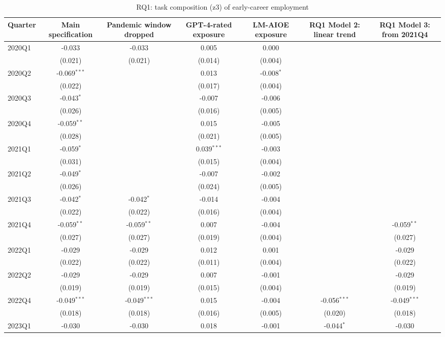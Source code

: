 \begin{table}[htbp]\centering
\caption{RQ1: task composition (z3) of early-career employment}
\begin{tabular}{lcccccc}
\toprule
Quarter & Main specification & Pandemic window dropped & GPT-4-rated exposure & LM-AIOE exposure & RQ1 Model 2: linear trend & RQ1 Model 3: from 2021Q4 \\
\midrule
2020Q1 & -0.033 & -0.033 & 0.005 & 0.000 &  &  \\
 & (0.021) & (0.021) & (0.014) & (0.004) &  &  \\
2020Q2 & -0.069$^{***}$ &  & 0.013 & -0.008$^{*}$ &  &  \\
 & (0.022) &  & (0.017) & (0.004) &  &  \\
2020Q3 & -0.043$^{*}$ &  & -0.007 & -0.006 &  &  \\
 & (0.026) &  & (0.016) & (0.005) &  &  \\
2020Q4 & -0.059$^{**}$ &  & 0.015 & -0.005 &  &  \\
 & (0.028) &  & (0.021) & (0.005) &  &  \\
2021Q1 & -0.059$^{*}$ &  & 0.039$^{***}$ & -0.003 &  &  \\
 & (0.031) &  & (0.015) & (0.004) &  &  \\
2021Q2 & -0.049$^{*}$ &  & -0.007 & -0.002 &  &  \\
 & (0.026) &  & (0.024) & (0.005) &  &  \\
2021Q3 & -0.042$^{*}$ & -0.042$^{*}$ & -0.014 & -0.004 &  &  \\
 & (0.022) & (0.022) & (0.016) & (0.004) &  &  \\
2021Q4 & -0.059$^{**}$ & -0.059$^{**}$ & 0.007 & -0.004 &  & -0.059$^{**}$ \\
 & (0.027) & (0.027) & (0.019) & (0.004) &  & (0.027) \\
2022Q1 & -0.029 & -0.029 & 0.012 & 0.001 &  & -0.029 \\
 & (0.022) & (0.022) & (0.011) & (0.004) &  & (0.022) \\
2022Q2 & -0.029 & -0.029 & 0.007 & -0.001 &  & -0.029 \\
 & (0.019) & (0.019) & (0.015) & (0.004) &  & (0.019) \\
2022Q4 & -0.049$^{***}$ & -0.049$^{***}$ & 0.015 & -0.004 & -0.056$^{***}$ & -0.049$^{***}$ \\
 & (0.018) & (0.018) & (0.016) & (0.005) & (0.020) & (0.018) \\
2023Q1 & -0.030 & -0.030 & 0.018 & -0.001 & -0.044$^{*}$ & -0.030 \\

\end{tabular}
\end{table}
